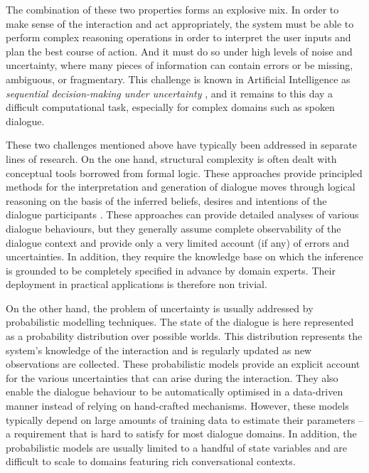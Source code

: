 The combination of these two properties forms an explosive mix.  In order to make sense of the interaction and act appropriately, the system must be able to perform complex reasoning operations in order to interpret the user inputs and plan the best course of action.  And it must do so under high levels of noise and uncertainty, where many pieces of information can contain errors or be missing, ambiguous, or fragmentary. This challenge is known in Artificial Intelligence as \textit{sequential decision-making under uncertainty} \citep{aima2010}, and it remains to this day a difficult computational task, especially for complex domains such as spoken dialogue. 

These two challenges mentioned above have typically been addressed in separate lines of research.  On the one hand, structural complexity is often dealt with conceptual tools borrowed from formal logic.  These approaches provide principled methods for the interpretation and generation of dialogue moves through logical reasoning on the basis of the inferred beliefs, desires and intentions of the dialogue participants \citep{Allen1980}. These approaches can provide detailed analyses of various dialogue behaviours, but they generally assume complete observability of the dialogue context and provide only a very limited account (if any) of errors and uncertainties. In addition, they require the knowledge base on which the inference is grounded to be completely specified in advance by domain experts.  Their deployment in practical applications is therefore non trivial. 

On the other hand, the problem of uncertainty is usually addressed by probabilistic modelling techniques.  The state of the dialogue is here represented as a probability distribution over possible worlds.  This distribution represents the system's knowledge of the interaction and is regularly updated as new observations are collected. These probabilistic models provide an explicit account for the various uncertainties that can arise during the interaction. They also enable the dialogue behaviour to be automatically optimised in a data-driven manner instead of relying on hand-crafted mechanisms.  However, these models typically depend on large amounts of training data to estimate their parameters -- a requirement that is hard to satisfy for most dialogue domains.  In addition, the probabilistic models are usually limited to a handful of state variables and are difficult to scale to domains featuring rich conversational contexts. 

